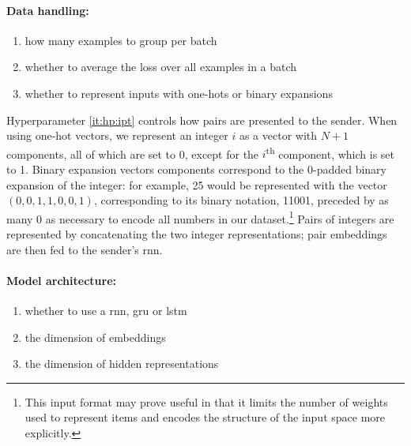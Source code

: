\documentclass[twocolumn]{article}
\begin{document}
\vspace*{-0.5em}
\paragraph{Data handling:}
\begin{enumerate}[resume*]
    \vspace*{-0.5em}
    \itemsep-0.25em 
    \item \label{it:hp:batch} how many examples to group per batch
    \item \label{it:hp:avg} whether to average the loss over all examples in a batch
    \item \label{it:hp:ipt} whether to represent inputs with one-hots or binary expansions
\end{enumerate}

Hyperparameter \ref{it:hp:ipt} controls how pairs are presented to the sender.
When using one-hot vectors, we represent an integer $i$ as a vector with $N+1$ components, all of which are set to 0, except for the $i$\textsuperscript{th} component, which is set to 1. 
Binary expansion vectors components correspond to the 0-padded binary expansion of the integer: for example, 25 would be represented with the vector $( 0, 0, 1, 1, 0, 0, 1)$, corresponding to its binary notation, 11001, preceded by as many 0 as necessary to encode all numbers in our dataset.\footnote{
    This input format may prove useful in that it limits the number of weights used to represent items and encodes the structure of the input space more explicitly.
}
Pairs of integers are represented by concatenating the two integer representations; pair embeddings are then fed to the sender's {\sc rnn}.

\vspace*{-0.5em}
\paragraph{Model architecture:}
\begin{enumerate}[resume*]
    \vspace*{-0.5em}
    \itemsep-0.25em 
    \item whether to use a {\sc rnn}, {\sc gru} or {\sc lstm}
    \item the dimension of embeddings
    \item the dimension of hidden representations
\end{enumerate}

\vspace*{-0.5em}
\end{document}
